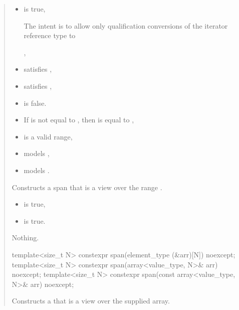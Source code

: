 \documentclass{wg21}
\begin{document}
\begin{quote}
\begin{addedblock}

\begin{itemdescr}
	 \pnum
	\constraints
	\begin{itemize}
		\item {} is true,
		\begin{note}The intent is to allow only qualification conversions of the iterator reference type to  \end{note},
		\item {} satisfies ,
		\item {} satisfies ,
		\item {} is false.
	\end{itemize}

    \expects
    \begin{itemize}
    \item
    If  is not equal to ,
    then  is equal to ,
    \item {} is a valid range,
    \item {} models ,
    \item {} models .
    \end{itemize}

    \pnum
    \effects
    Constructs a span that is a view over the range .

    \pnum
    \ensures
    
    \begin{itemize}
    	\item {} is true,
    	\item {} is true.
    \end{itemize}
   
    \pnum
    \throws
    Nothing.


\end{itemdescr}
\end{addedblock}

\begin{itemdecl}
template<size_t N> constexpr span(element_type (&arr)[N]) noexcept;
template<size_t N> constexpr span(array<value_type, N>& arr) noexcept;
template<size_t N> constexpr span(const array<value_type, N>& arr) noexcept;
\end{itemdecl}
\begin{itemdescr}
    \pnum
    \effects
    Constructs a  that is a view over the supplied array.


\end{itemdescr}
\end{quote}
\end{document}
